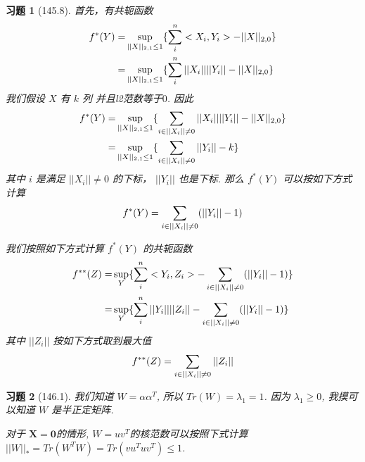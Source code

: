 \documentclass[a4paper, UTF8]{ctexart}
\newtheorem*{exercise}{\textbf{习题}}
\begin{document}
	\begin{exercise}[145.8]
		首先，有共轭函数
		\begin{equation}
		\notag
		\begin{split}
		f^*(Y) = & \sup_{||X||_{2,1} \leq 1} \{\sum_i^n <X_i, Y_i> - ||X||_{2, 0}\} \\
		= & \sup_{||X||_{2,1} \leq 1} \{\sum_i^n ||X_i|| ||Y_i|| - ||X||_{2, 0}\} 
		\end{split}
		\end{equation}
		我们假设 $X$ 有 $k$ 列 并且l2范数等于$0$. 因此
		\begin{equation}
		\notag
		\begin{split}
		f^*(Y) = & \sup_{||X||_{2,1} \leq 1} \{\sum_{i \in ||X_i|| \neq 0} ||X_i|| ||Y_i|| - ||X||_{2, 0}\} \\
		= & \sup_{||X||_{2,1} \leq 1} \{\sum_{i \in ||X_i|| \neq 0}||Y_i|| - k\}
		\end{split}
		\end{equation}
		其中 $i$ 是满足 $||X_i|| \neq 0$ 的下标， $||Y_i||$ 也是下标. 那么 $f^*(Y)$ 可以按如下方式计算
		\begin{equation}
		\notag
		\begin{split}
		f^*(Y) = \sum_{i \in ||X_i|| \neq 0}(||Y_i|| - 1)
		\end{split}
		\end{equation}

		我们按照如下方式计算 $f^*(Y)$ 的共轭函数
		\begin{equation}
		\notag
		\begin{split}
		f^{**}(Z) = & \sup_Y \{\sum_i^n <Y_i, Z_i> - \sum_{i \in ||X_i|| \neq 0}(||Y_i|| - 1) \} \\
		= & \sup_Y \{\sum_i^n ||Y_i|| ||Z_i|| - \sum_{i \in ||X_i|| \neq 0}(||Y_i|| - 1)\} 
		\end{split}
		\end{equation}
		其中 $||Z_i||$ 按如下方式取到最大值
		\begin{equation}
		\notag
		\begin{split}
		f^{**}(Z) = \sum_{i \in ||X_i|| \neq 0} ||Z_i||
		\end{split}
		\end{equation}
	\end{exercise}

	\begin{exercise}[146.1]
		我们知道 $W = \alpha \alpha^T$, 所以 $Tr(W) = \lambda_1 = 1$. 因为 $\lambda_1 \ge 0$, 我摸可以知道 $W$ 是半正定矩阵.

		对于 $\mathbf{X} = \mathbf{0}$的情形, $W = uv^T$的核范数可以按照下式计算 $||W||_* = Tr(W^TW) = Tr(vu^Tuv^T) \leq 1$.

	\end{exercise}
\end{document}
